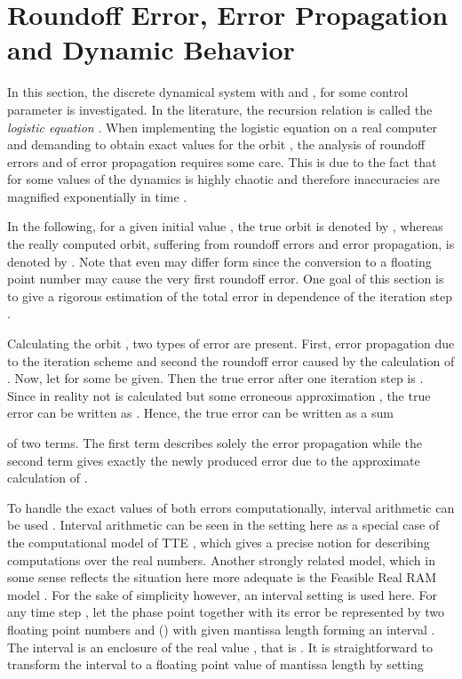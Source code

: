 \documentclass[copyright,creativecommons]{eptcs}
\theoremstyle{definition}
\begin{document}
\section{Roundoff Error, Error Propagation and Dynamic Behavior}

In this section, the discrete dynamical system  with  and
,  for some control parameter 
is investigated. In the literature, the recursion relation  is
called the {\em logistic equation} \cite{ce80}. When implementing the logistic
equation on a real computer and demanding to obtain exact values for the
orbit , the analysis of roundoff errors and of error propagation
requires some care. This is due to the fact that for some values of 
the dynamics is highly chaotic and therefore inaccuracies are magnified
exponentially in time \cite{ce06, hsd04}.

In the following, for a given initial value , the true orbit is denoted by
, whereas the really computed orbit, suffering from roundoff errors
and error propagation, is denoted by . Note that even
 may differ form  since the conversion to a floating point
number may cause the very first roundoff error. One goal of this section
is to give a rigorous estimation of the total error in dependence of the
iteration step .

Calculating the orbit , two types of error are present.
First, error propagation due to the iteration scheme and second the
roundoff error caused by the calculation of . Now, let 
for some  be given. Then the true error after one iteration step
is . Since in reality not  is
calculated but some erroneous approximation ,
the true error can be written as
.
Hence, the true error can be written as a sum

of two terms. The first term describes solely the error propagation
while the second term gives exactly the newly produced error
due to the approximate calculation of .

To handle the exact values of both errors computationally, interval
arithmetic can be used \cite{ah83}. Interval arithmetic can be seen
in the setting here as a special case of the computational model
of TTE \cite{wh00}, which gives a precise notion for describing
computations over the real numbers. Another strongly related model,
which in some sense reflects the situation here more adequate is the
Feasible Real RAM model \cite{BH98}. For the sake of simplicity however,
an interval setting is used here. For any time step , let
the phase point  together with its error be represented by two
floating point numbers  and  () with
given mantissa length  forming an interval . The
interval is an enclosure of the real value , that is
. It is straightforward to transform
the interval to a floating point value  of
mantissa length  by setting
\end{document}
